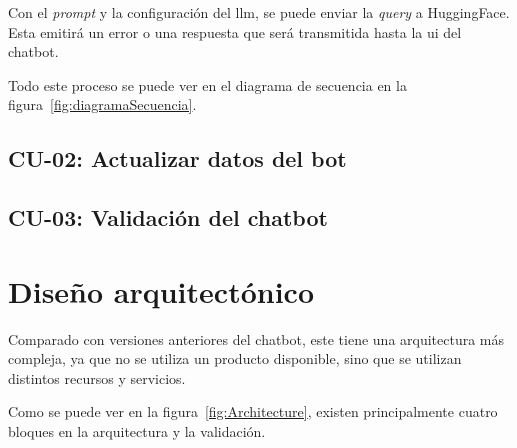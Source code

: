 Con el \textit{prompt} y la configuración del \acrshort{llm}, se puede enviar la \textit{query} a HuggingFace. Esta emitirá un error o una respuesta que será transmitida hasta la \acrshort{ui} del chatbot. 

Todo este proceso se puede ver en el diagrama de secuencia en la figura~\ref{fig:diagramaSecuencia}.


\subsection{CU-02: Actualizar datos del bot}


\subsection{CU-03: Validación del chatbot}


\section{Diseño arquitectónico}

Comparado con versiones anteriores del chatbot, este tiene una arquitectura más compleja, ya que no se utiliza un producto disponible, sino que se utilizan distintos recursos y servicios.

Como se puede ver en la figura~\ref{fig:Architecture}, existen principalmente cuatro bloques en la arquitectura y la validación.


